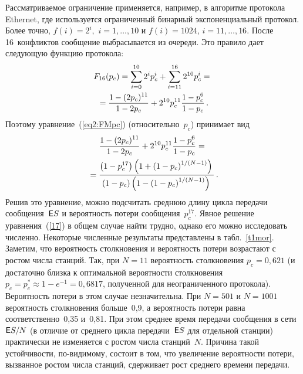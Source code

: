 \begin{multicols}{2}
 Рассматриваемое  ограничение применяется, например, в  алгоритме
протокола Ethernet, где используется ограниченный бинарный
экспоненциальный протокол. Более точно, $f(i)=2^i,$ $i=1,\dots,10$ и
$f(i)=1024$, $i=11,\ldots,16$. После 16~конфликтов сообщение
выбрасывается из очереди. Это правило дает следующую функцию протокола:
\begin{multline*}
   F_{16}(p_c)=\sum_{i=0}^{10} 2^ip_c^i + \sum_{i=11}^{16} 2^{10} p_c^i ={}\\
   {}=\displaystyle\frac{\displaystyle 1-(2p_c)^{11}\mathstrut}{\displaystyle 1-2p_c\mathstrut}+2^{10}p_c^{11}\displaystyle\frac{\displaystyle 1-p_c^6\mathstrut}{\displaystyle 1-p_c\mathstrut}\,.
\end{multline*}
Поэтому уравнение~(\ref{eq2:FMpc}) (относительно~$p_c$) принимает вид
\begin{multline}
\displaystyle\frac{\displaystyle 1-(2p_c)^{11}\mathstrut}{\displaystyle 1-2p_c\mathstrut}+2^{10}p_c^{11}\displaystyle\frac{\displaystyle 1-p_c^6\mathstrut}{\displaystyle 1-p_c\mathstrut} ={}\\
{}=
\displaystyle\frac{\displaystyle \left(1-p_c^{17}\right)\left(1+\left(1-p_c\right)^{1/(N-1)}\right)\mathstrut}{\displaystyle \left(1-p_c\right)\left(1-\left(1-p_c\right)^{1/(N-1)}\right)\mathstrut}\,.
   \label{17}
\end{multline}
Решив это уравнение,  можно подсчитать  среднюю длину цикла передачи
сообщения~${\sf E} S $   и вероятность  потери  сообщения~$p_c^{17}$.
Явное  решение уравнения~(\ref{17}) в общем случае найти трудно,
однако его  можно исследовать численно. Некоторые численные результаты
представлены в  табл.~\ref{t1mor}.
Заметим, что вероятность столкновения и вероятность потери
возрастают с ростом числа станций. Так, при $N=11$  вероятность
столкновения $p_c=0{,}621$ (и достаточно близка к оптимальной
вероятности столкновения $p_c=p_c^*\approx 1-e^{-1}=0{,}6817$,
полученной  для неограниченного протокола). Вероятность потери в
этом случае незначительна. При $N=501$ и $N=1001$ вероятность
столкновения  больше~0,9, а вероятность потери  равна
соответственно~0,35 и~0,81. При этом среднее время передачи
сообщения  в сети ${\sf E} S/N$ (в отличие от среднего цикла передачи~${\sf E}
S$ для отдельной станции) практически не изменяется  с ростом числа
станций~$N$.  Причина такой устойчивости, по-видимому, состоит в
том, что увеличение вероятности потери, вызванное ростом числа
станций, сдерживает рост среднего времени передачи.

\begin{table*}\small
\begin{center}
 \vspace*{2ex}
 

\end{center}
\end{table*}
\end{multicols}
